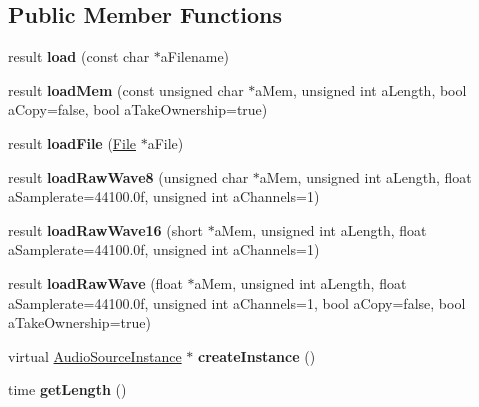 \subsection*{Public Member Functions}
\begin{DoxyCompactItemize}
\item 
\mbox{\label{class_so_loud_1_1_wav_aede2b2cea88eec6b9baa81dc503eeb42}} 
result {\bfseries load} (const char $\ast$a\+Filename)
\item 
\mbox{\label{class_so_loud_1_1_wav_a73524222e2e4c007ce63a14d01691afc}} 
result {\bfseries load\+Mem} (const unsigned char $\ast$a\+Mem, unsigned int a\+Length, bool a\+Copy=false, bool a\+Take\+Ownership=true)
\item 
\mbox{\label{class_so_loud_1_1_wav_a79d1999bf6b95de7f284d45fc126537f}} 
result {\bfseries load\+File} (\mbox{\hyperlink{class_so_loud_1_1_file}{File}} $\ast$a\+File)
\item 
\mbox{\label{class_so_loud_1_1_wav_a81c538d8649e90996abef2ce6928fda8}} 
result {\bfseries load\+Raw\+Wave8} (unsigned char $\ast$a\+Mem, unsigned int a\+Length, float a\+Samplerate=44100.\+0f, unsigned int a\+Channels=1)
\item 
\mbox{\label{class_so_loud_1_1_wav_aee6d7d0de96dfb1a646b9b82e1b35736}} 
result {\bfseries load\+Raw\+Wave16} (short $\ast$a\+Mem, unsigned int a\+Length, float a\+Samplerate=44100.\+0f, unsigned int a\+Channels=1)
\item 
\mbox{\label{class_so_loud_1_1_wav_a16bc4b9f21cd6a7470fcd374ff19cd68}} 
result {\bfseries load\+Raw\+Wave} (float $\ast$a\+Mem, unsigned int a\+Length, float a\+Samplerate=44100.\+0f, unsigned int a\+Channels=1, bool a\+Copy=false, bool a\+Take\+Ownership=true)
\item 
\mbox{\label{class_so_loud_1_1_wav_a4b22c18d5723f5420bc2a8b5d58cbb59}} 
virtual \mbox{\hyperlink{class_so_loud_1_1_audio_source_instance}{Audio\+Source\+Instance}} $\ast$ {\bfseries create\+Instance} ()
\item 
\mbox{\label{class_so_loud_1_1_wav_a3226f88902c153ea581e45cdc0632021}} 
time {\bfseries get\+Length} ()
\end{DoxyCompactItemize}
